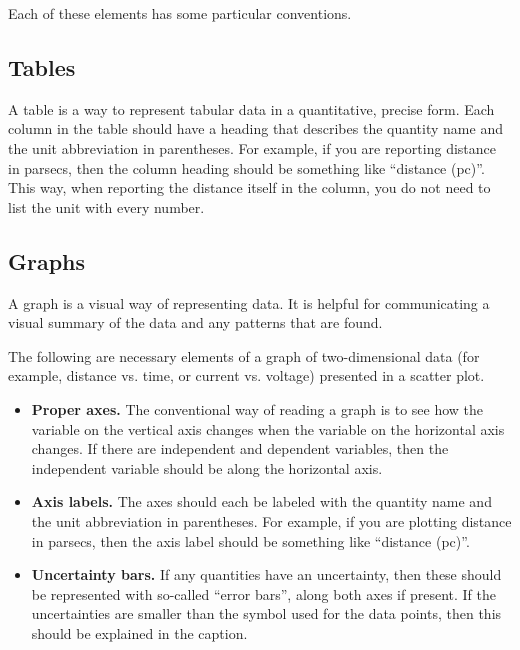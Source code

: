Each of these elements has some particular conventions.

\subsection{Tables}

A table is a way to represent tabular data in a quantitative, precise form. Each column in the table should have a heading that describes the quantity name and the unit abbreviation in parentheses. For example, if you are reporting distance in parsecs, then the column heading should be something like ``distance (pc)''. This way, when reporting the distance itself in the column, you do not need to list the unit with every number.

\subsection{Graphs}

A graph is a visual way of representing data. It is helpful for communicating a visual summary of the data and any patterns that are found.

The following are necessary elements of a graph of two-dimensional data (for example, distance vs. time, or current vs. voltage) presented in a scatter plot.

\begin{itemize}
	\item \textbf{Proper axes.} The conventional way of reading a graph is to see how the variable on the vertical axis changes when the variable on the horizontal axis changes. If there are independent and dependent variables, then the independent variable should be along the horizontal axis.
	
	\item \textbf{Axis labels.} The axes should each be labeled with the quantity name and the unit abbreviation in parentheses. For example, if you are plotting distance in parsecs, then the axis label should be something like ``distance (pc)''.
	
	\item \textbf{Uncertainty bars.} If any quantities have an uncertainty, then these should be represented with so-called ``error bars'', along both axes if present. If the uncertainties are smaller than the symbol used for the data points, then this should be explained in the caption.

\end{itemize}
